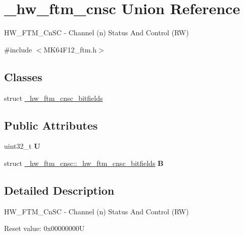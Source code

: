 \hypertarget{union__hw__ftm__cnsc}{}\section{\+\_\+hw\+\_\+ftm\+\_\+cnsc Union Reference}
\label{union__hw__ftm__cnsc}


H\+W\+\_\+\+F\+T\+M\+\_\+\+Cn\+SC -\/ Channel (n) Status And Control (RW)  




{\ttfamily \#include $<$M\+K64\+F12\+\_\+ftm.\+h$>$}

\subsection*{Classes}
\begin{DoxyCompactItemize}
\item 
struct \hyperlink{struct__hw__ftm__cnsc_1_1__hw__ftm__cnsc__bitfields}{\+\_\+hw\+\_\+ftm\+\_\+cnsc\+\_\+bitfields}
\end{DoxyCompactItemize}
\subsection*{Public Attributes}
\begin{DoxyCompactItemize}
\item 
uint32\+\_\+t {\bfseries U}\hypertarget{union__hw__ftm__cnsc_a3ee1fb936356bc7a3ec614c6148f4d5d}{}\label{union__hw__ftm__cnsc_a3ee1fb936356bc7a3ec614c6148f4d5d}

\item 
struct \hyperlink{struct__hw__ftm__cnsc_1_1__hw__ftm__cnsc__bitfields}{\+\_\+hw\+\_\+ftm\+\_\+cnsc\+::\+\_\+hw\+\_\+ftm\+\_\+cnsc\+\_\+bitfields} {\bfseries B}\hypertarget{union__hw__ftm__cnsc_a4dfb72bf46ce12c66ec029ee766c6a5e}{}\label{union__hw__ftm__cnsc_a4dfb72bf46ce12c66ec029ee766c6a5e}

\end{DoxyCompactItemize}


\subsection{Detailed Description}
H\+W\+\_\+\+F\+T\+M\+\_\+\+Cn\+SC -\/ Channel (n) Status And Control (RW) 

Reset value\+: 0x00000000U

